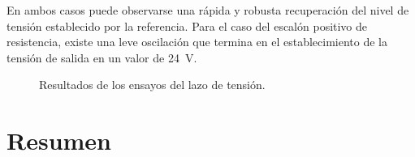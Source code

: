 En ambos casos puede observarse una rápida y robusta recuperación del nivel de tensión establecido por la referencia. Para el caso del escalón positivo de resistencia, existe una leve oscilación que termina en el establecimiento de la tensión de salida en un valor de \SI{24}{\volt}.

\begin{figure}[hbt!]
  \centering
  \caption{Resultados de los ensayos del lazo de tensión.}
  \label{var-r-lazo-tension}
\end{figure}

\section{Resumen}

\newpage